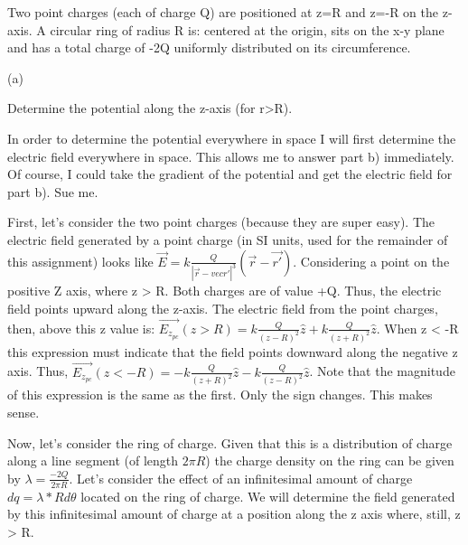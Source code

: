 \begin{homeworkProblem}

Two point charges (each of charge Q) are positioned at z=R and z=-R on the z-axis. 
A circular ring of radius R is: centered at the origin, sits on the x-y plane and has a total 
charge of -2Q uniformly distributed on its circumference. 

\begin{homeworkSection}{(a)} 

Determine the potential along the z-axis (for r>R). 

In order to determine the potential everywhere in space I will first determine the electric field everywhere in space. This allows me to answer part b) immediately. Of course, I could take the gradient of the potential and get the electric field for part b). Sue me.

First, let's consider the two point charges (because they are super easy). The electric field generated by a point charge (in SI units, used for the remainder of this assignment) looks like $\vec{E} = k \frac{Q}{|\vec{r}-vec{r'}|^3}(\vec{r}-\vec{r'})$. Considering a point on the positive Z axis, where z > R. Both charges are of value +Q. Thus, the electric field points upward along the z-axis. The electric field from the point charges, then, above this z value is: $ \vec{E_{z_{pc}}}(z>R) = k \frac{Q}{(z-R)^2}\hat{z} + k \frac{Q}{(z+R)^2}\hat{z} $. When z < -R this expression must indicate that the field points downward along the negative z axis. Thus, $\vec{E_{z_{pc}}}(z<-R) = -k \frac{Q}{(z+R)^2} \hat{z} - k \frac{Q}{(z-R)^2} \hat{z}$. Note that the magnitude of this expression is the same as the first. Only the sign changes. This makes sense.

Now, let's consider the ring of charge. Given that this is a distribution of charge along a line segment (of length $2\pi R$) the charge density on the ring can be given by $\lambda = \frac{-2Q}{2\pi R}$. Let's consider the effect of an infinitesimal amount of charge $dq = \lambda * R d\theta$ located on the ring of charge. We will determine the field generated by this infinitesimal amount of charge at a position along the z axis where, still, z > R.


\end{homeworkSection}
\end{homeworkProblem}
